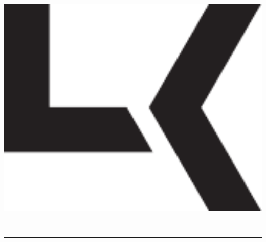 \documentclass[a4paper, final, 12pt, oneside]{scrartcl}
\numberwithin{equation}{section}
\numberwithin{table}{section}
\numberwithin{figure}{section}
\begin{document}
\setlength{\parindent}{0pt}

\thispagestyle{empty}

\begin{minipage}{\textwidth}
  \begin{minipage}[h]{0.11\textwidth}
      \includegraphics[width=1\textwidth]{../general/logo_black.pdf}
  \end{minipage}
  \hfill
  \begin{minipage}[h]{0.8\textwidth}
      {\huge \textbf{\textsf{\productName}}}\\
      {\huge \textbf{\textsf{\productNumber}}}
  \end{minipage}
\end{minipage}       
       
\vspace*{5pt}
\rule{\textwidth}{0.4pt}
\end{document}
